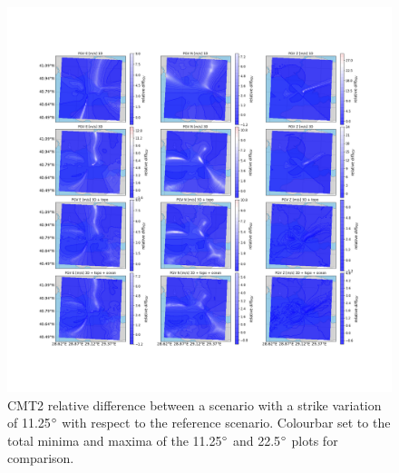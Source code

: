 \documentclass[../Text/00main.tex]{subfiles}
\begin{document}
\begin{figure}[!h]
    \centering
    \includegraphics[width=1\linewidth,trim = 2cm 5cm 1cm 5cm, clip]{images_results/strike_variation_epsilon12_sc2.png}
    \caption{CMT2 relative difference between a scenario with a strike variation of 11.25$\degree$ with respect to the reference scenario. Colourbar set to the total minima and maxima of the 11.25$\degree$ and 22.5$\degree$ plots for comparison.}
    \label{fig:ref_eps12-2}
\end{figure}
\end{document}
